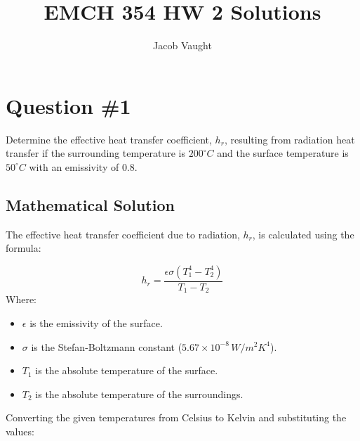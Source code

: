\documentclass[12pt]{article}
\title{EMCH 354 HW 2 Solutions}
\author{Jacob Vaught}
\date{}
\begin{document}
\maketitle

\section*{Question \#1}
Determine the effective heat transfer coefficient, \( h_r \), resulting from radiation heat transfer if the surrounding temperature is \( 200^\circ C \) and the surface temperature is \( 50^\circ C \) with an emissivity of \( 0.8 \).
\begin{center}
\end{center}

\subsection*{Mathematical Solution}
The effective heat transfer coefficient due to radiation, \( h_r \), is calculated using the formula:

\[
h_r = \frac{\epsilon \sigma (T_1^4 - T_2^4)}{T_1 - T_2}
\]
\noindent
Where:
\begin{itemize}
    \item \(\epsilon\) is the emissivity of the surface.
    \item \(\sigma\) is the Stefan-Boltzmann constant (\(5.67 \times 10^{-8} \, W/m^2K^4\)).
    \item \(T_1\) is the absolute temperature of the surface.
    \item \(T_2\) is the absolute temperature of the surroundings.
\end{itemize}
\noindent
Converting the given temperatures from Celsius to Kelvin and substituting the values:
\end{document}
